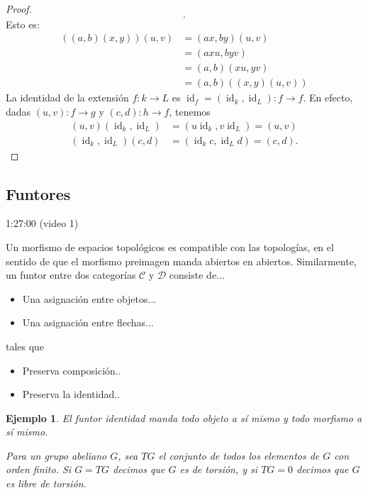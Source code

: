 \documentclass[12pt,letterpaper,titlepage]{article}
\newtheorem*{exa}{Ejemplo}
\theoremstyle{definition}
\renewcommand\cal[1]{\mathcal{#1}}
\newcommand\<{\langle}
\renewcommand\>{\rangle}
\DeclareMathOperator{\id}{id}
\begin{document}
\begin{proof}
\[  .\]
  Esto es:
  \begin{align*}
      ((a,b)(x,y))(u,v)
      &= (ax,by)(u,v) \\
      &= (axu,byv) \\
      &= (a,b)(xu,yv) \\
      &= (a,b)((x,y)(u,v))
  \end{align*}
  La identidad de la extensión $f:k\to L$ es
  $\id_f = (\id_k,\id_L):f\to f$.
  En efecto, dadas $(u,v):f\to g$ y $(c,d):h\to f$, tenemos
  \begin{align*}
      (u,v)(\id_k,\id_L) &= (u \id_k,v \id_L) = (u,v) \\
      (\id_k,\id_L)(c,d) &= (\id_k c,\id_L d) = (c,d).
  \end{align*}
\end{proof}

\subsection{Funtores}

1:27:00 (video 1)

Un morfismo de espacios topológicos es compatible con
las topologías, en el sentido de que el morfismo preimagen
manda abiertos en abiertos.
Similarmente, un funtor entre dos categorías $\cal C$ y $\cal D$
consiste de...
\begin{itemize}
  \item Una asignación entre objetos...
  \item Una asignación entre flechas...
\end{itemize}

tales que
\begin{itemize}
  \item Preserva composición..
  \item Preserva la identidad..
\end{itemize}

\begin{exa}
  \item El funtor identidad manda todo objeto a sí mismo y todo
    morfismo a sí mismo.
  \item Para un grupo abeliano $G$, sea $TG$ el conjunto de todos
    los elementos de $G$ con orden finito.
    Si $G=TG$ decimos que $G$ es de torsión, y si $TG=0$ decimos
    que $G$ es libre de torsión.
\end{exa}
\end{document}
